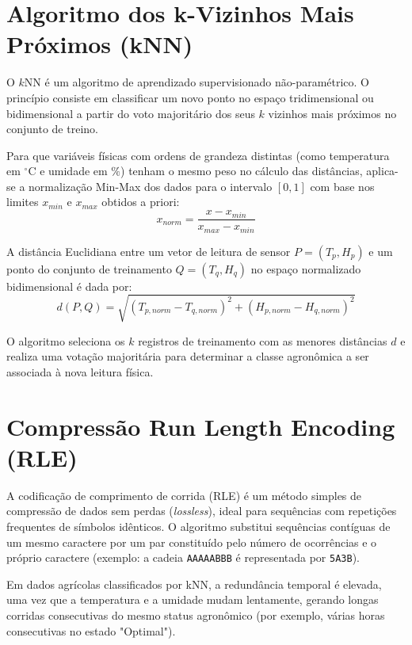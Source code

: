 \documentclass[
	12pt,
	openright,
	oneside,
	a4paper,
	english,
	brazil
	]{abntex2}
\begin{document}
\section{Algoritmo dos k-Vizinhos Mais Próximos (kNN)}

O $k$NN é um algoritmo de aprendizado supervisionado não-paramétrico. O princípio consiste em classificar um novo ponto no espaço tridimensional ou bidimensional a partir do voto majoritário dos seus $k$ vizinhos mais próximos no conjunto de treino.

Para que variáveis físicas com ordens de grandeza distintas (como temperatura em ${}^\circ\text{C}$ e umidade em $\%$) tenham o mesmo peso no cálculo das distâncias, aplica-se a normalização Min-Max dos dados para o intervalo $[0, 1]$ com base nos limites $x_{min}$ e $x_{max}$ obtidos a priori:
\begin{equation}
x_{norm} = \frac{x - x_{min}}{x_{max} - x_{min}}
\end{equation}

A distância Euclidiana entre um vetor de leitura de sensor $P = (T_p, H_p)$ e um ponto do conjunto de treinamento $Q = (T_q, H_q)$ no espaço normalizado bidimensional é dada por:
\begin{equation}
d(P, Q) = \sqrt{(T_{p,norm} - T_{q,norm})^2 + (H_{p,norm} - H_{q,norm})^2}
\end{equation}

O algoritmo seleciona os $k$ registros de treinamento com as menores distâncias $d$ e realiza uma votação majoritária para determinar a classe agronômica a ser associada à nova leitura física.

\section{Compressão Run Length Encoding (RLE)}

A codificação de comprimento de corrida (RLE) é um método simples de compressão de dados sem perdas (\textit{lossless}), ideal para sequências com repetições frequentes de símbolos idênticos. O algoritmo substitui sequências contíguas de um mesmo caractere por um par constituído pelo número de ocorrências e o próprio caractere (exemplo: a cadeia \texttt{AAAAABBB} é representada por \texttt{5A3B}). 

Em dados agrícolas classificados por kNN, a redundância temporal é elevada, uma vez que a temperatura e a umidade mudam lentamente, gerando longas corridas consecutivas do mesmo status agronômico (por exemplo, várias horas consecutivas no estado "Optimal").
\end{document}

